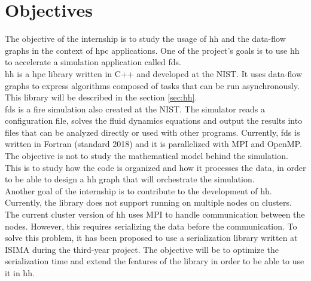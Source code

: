 
\clearpage
\section{Objectives}

The objective of the internship is to study the usage of \gls{hh} and the
data-flow graphs in the context of \gls{hpc} applications. One of the project's
goals is to use \gls{hh} to accelerate a simulation application called
\gls{fds}.\\

\gls{hh} is a \gls{hpc} library written in C++ and developed at the NIST. It
uses data-flow graphs to express algorithms composed of tasks that can be run
asynchronously. This library will be described in the section \ref{sec:hh}.\\

\gls{fds} is a fire simulation also created at the NIST. The simulator reads a
configuration file, solves the fluid dynamics equations and output the results
into files that can be analyzed directly or used with other programs. Currently,
\gls{fds} is written in Fortran (standard 2018) and it is parallelized with MPI
and OpenMP. The objective is not to study the mathematical model behind the
simulation. This is to study how the code is organized and how it processes the
data, in order to be able to design a \gls{hh} graph that will orchestrate the
simulation.\\

Another goal of the internship is to contribute to the development of \gls{hh}.
Currently, the library does not support running on multiple nodes on clusters.
The current cluster version of \gls{hh} uses MPI to handle communication between
the nodes. However, this requires serializing the data before the communication.
To solve this problem, it has been proposed to use a serialization library
written at ISIMA during the third-year project. The objective will be to
optimize the serialization time and extend the features of the library in order
to be able to use it in \gls{hh}.

